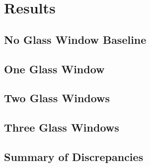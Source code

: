 \chapter{Results}
\label{chap:results}

\section{No Glass Window Baseline}
\label{sec:results-baseline}


\section{One Glass Window}
\label{sec:results-1-window}


\section{Two Glass Windows}
\label{sec:results-2-windows}


\section{Three Glass Windows}
\label{sec:results-3-windows}


\section{Summary of Discrepancies}
\label{sec:results-summary}

